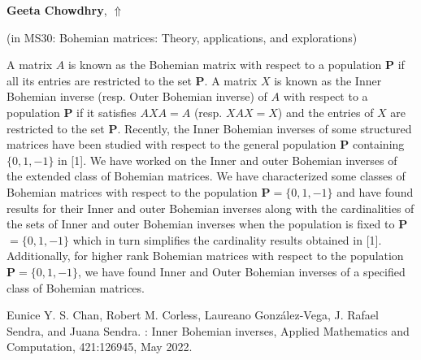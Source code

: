 \documentclass[ILAS2025-program.tex]{subfiles}
\begin{document}
\hypertarget{down0232}{}\begin{ilasabstract}
    
\textbf{Geeta Chowdhry},  \hfill \hyperlink{up0232}{$\Uparrow$}
    
    
(in {\color{mstitle}MS30: Bohemian matrices: Theory, applications, and explorations})
        
\mtskip
    A matrix $A$ is known as the Bohemian matrix with respect to a population \textbf{P} if all its entries are restricted to the set \textbf{P}. A matrix $X$ is known as the Inner Bohemian inverse (resp. Outer Bohemian inverse) of $A$ with respect to a population \textbf{P} if it satisfies $AXA=A$ (resp. $XAX=X$) and the entries of $X$ are restricted to the set \textbf{P}.
Recently, the Inner Bohemian inverses of some structured matrices have been studied with respect to the general population \textbf{P} containing $\{0,1,-1\}$ in [1]. We have worked on the Inner and outer Bohemian inverses of the extended class of Bohemian matrices. We have characterized some classes of Bohemian matrices with respect to the population \textbf{P}$=\{0,1,-1\}$ and have found results for their Inner and outer Bohemian inverses along with the cardinalities of the sets of Inner and outer Bohemian inverses when the population is fixed to \textbf{P}$=\{0,1,-1\}$ which in turn simplifies the cardinality results obtained in [1]. Additionally, for higher rank Bohemian matrices with respect to the population \textbf{P}$=\{0,1,-1\}$, we have found Inner and Outer Bohemian inverses of a specified class of Bohemian matrices.

\text{[1]} Eunice Y. S. Chan, Robert M. Corless, Laureano González-Vega, J. Rafael Sendra, and Juana Sendra. : Inner Bohemian inverses, Applied Mathematics and Computation, 421:126945, May 2022.

\end{ilasabstract}
    
\end{document}
